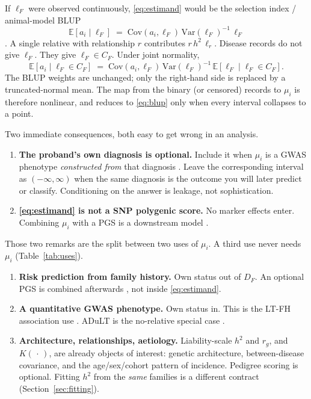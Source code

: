 \documentclass[11pt,a4paper]{article}
\newcommand{\E}{\mathbb{E}}
\newcommand{\Var}{\mathrm{Var}}
\newcommand{\Cov}{\mathrm{Cov}}
\newcommand{\h}{h^{2}}
\begin{document}
If $\ell_F$ were observed continuously, \eqref{eq:estimand} would be
the selection index / animal-model BLUP
\begin{equation}
  \E[a_i\mid \ell_F]
  \;=\;
  \Cov(a_i,\ell_F)\,\Var(\ell_F)^{-1}\,\ell_F
  \label{eq:blup}
\end{equation}
\cite{hazel1943,henderson1975}.
A single relative with relationship $r$ contributes $r\,\h\,\ell_r$.
Disease records do not give $\ell_F$. They give
$\ell_F\in C_F$. Under joint normality,
\begin{equation}
  \E[a_i\mid \ell_F\in C_F]
  \;=\;
  \Cov(a_i,\ell_F)\,\Var(\ell_F)^{-1}\,
  \E[\ell_F\mid \ell_F\in C_F].
  \label{eq:blup-trunc}
\end{equation}
The BLUP weights are unchanged; only the right-hand side is replaced
by a truncated-normal mean.
The map from the binary (or censored) records to $\mu_i$ is therefore
nonlinear, and reduces to \eqref{eq:blup} only when every interval
collapses to a point.

Two immediate consequences, both easy to get wrong in an analysis.

\begin{enumerate}
\item \textbf{The proband's own diagnosis is optional.}
  Include it when $\mu_i$ is a GWAS phenotype \emph{constructed from}
  that diagnosis \cite{hujoel2020,pedersen2022}.
  Leave the corresponding interval as $(-\infty,\infty)$ when the
  same diagnosis is the outcome you will later predict or classify.
  Conditioning on the answer is leakage, not sophistication.
\item \textbf{\eqref{eq:estimand} is not a SNP polygenic score.}
  No marker effects enter.
  Combining $\mu_i$ with a PGS is a downstream model
  \cite{hujoel2022,krebs2026}.
\end{enumerate}

Those two remarks are the split between two uses of $\mu_i$.
A third use never needs $\mu_i$ (Table~\ref{tab:uses}).

\begin{enumerate}
\item[I.] \textbf{Risk prediction from family history.}
  Own status out of $D_F$.
  An optional PGS is combined afterwards
  \cite{hujoel2022,krebs2026}, not inside \eqref{eq:estimand}.
\item[II.] \textbf{A quantitative GWAS phenotype.}
  Own status in.
  This is the LT-FH association use \cite{hujoel2020}.
  ADuLT is the no-relative special case \cite{pedersen2023}.
\item[III.] \textbf{Architecture, relationships, aetiology.}
  Liability-scale $\h$ and $r_g$, and $K(\,\cdot\,)$, are already
  objects of interest: genetic architecture, between-disease
  covariance, and the age/sex/cohort pattern of incidence.
  Pedigree scoring is optional.
  Fitting $\h$ from the \emph{same} families is a different contract
  (Section~\ref{sec:fitting}).
\end{enumerate}
\end{document}

